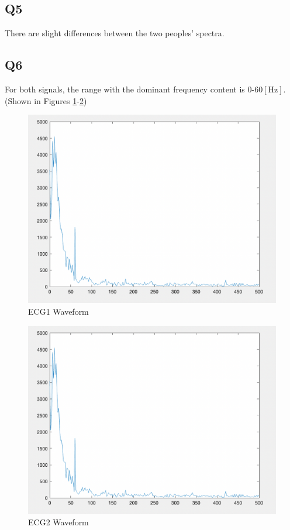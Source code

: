 \documentclass[
	letterpaper, %
	10pt, %
]{CSUniSchoolLabReport}
\begin{document}
\subsection{Q5} There are slight differences between the two peoples' spectra.

\subsection{Q6} For both signals, the range with the dominant frequency content is $0$-$60[\si{\hertz}]$. (Shown in Figures \ref{fig:7}-\ref{fig:8})

\begin{figure}[H]
  \centering
  \includegraphics[width=.9\textwidth]{Figures/L12Q6-1.png}
  \caption{ECG1 Waveform}
  \label{fig:7}
\end{figure}

\begin{figure}[H]
  \centering
  \includegraphics[width=.9\textwidth]{Figures/L12Q6-1.png}
  \caption{ECG2 Waveform}
  \label{fig:8}
\end{figure}
\end{document}
